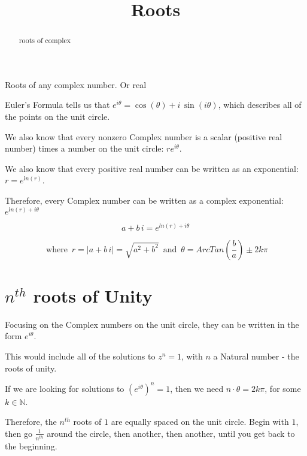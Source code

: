 \documentclass{ximera}
\title{Roots}
\begin{document}
\begin{abstract}
roots of complex
\end{abstract}
\maketitle





Roots of any complex number.  Or real








Euler's Formula tells us that $e^{i \theta} = \cos(\theta) + i \, \sin(i \theta)$, which describes all of the points on the unit circle.

We also know that every nonzero Complex number is a scalar (positive real number) times a number on the unit circle:  $r e^{i \theta}$.

We also know that every positive real number can be written as an exponential: $r = e^{ln(r)}$.

Therefore, every Complex number can be written as a complex exponential: $ e^{ln(r) + i \theta}$


\[   a + b \, i =    e^{ln(r) + i \theta}   \]

\[   \text{ where } \,   r = |a + b \, i| = \sqrt{a^2 + b^2}   \, \text{ and } \,   \theta = ArcTan\left (\frac{b}{a} \right) \pm 2k\pi\]





\section{$n^{th}$ roots of Unity}


Focusing on the Complex numbers on the unit circle, they can be written in the form $e^{i \theta}$.


This would include all of the solutions to $z^n = 1$, with $n$ a Natural number - the roots of unity.




If we are looking for solutions to $(e^{i \theta})^n = 1$, then we need $n \cdot \theta = 2k\pi$, for some $k \in \mathbb{N}$.


Therefore, the $n^{th}$ roots of $1$ are equally spaced on the unit circle.  Begin with $1$, then go $\frac{1}{n^{th}}$ around the circle, then another, then another, until you get back to the beginning.
\end{document}
